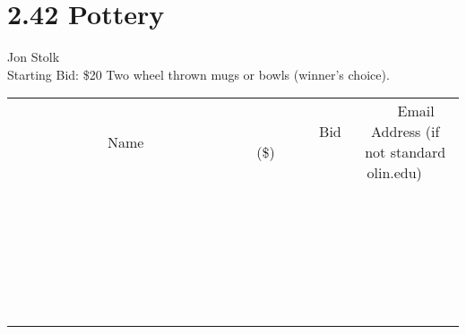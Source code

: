 \documentclass[11pt]{article}
\begin{document}
\section*{2.42 Pottery}
Jon Stolk
\\
Starting Bid: \$20
\newline
Two wheel thrown mugs or bowls (winner's choice).
\\[6ex]
\begin{tabular}{c c c}
~~~~~~~~~~~~~Name~~~~~~~~~~~~~ & ~~~~~~~~~Bid (\$)~~~~~~~~~  & ~~~Email Address (if not standard olin.edu)~~~\\
 & & \\
\hline
 & & \\
\hline
 & & \\
\hline
 & & \\
\hline
 & & \\
\hline
 & & \\
\hline
 & & \\
\hline
 & & \\
\hline
 & & \\
\hline
 & & \\
\hline
 & & \\
\hline
 & & \\
\hline
 & & \\
\hline
 & & \\
\hline
 & & \\
\hline
 & & \\
\hline
 & & \\
\hline
 & & \\
\hline
 & & \\
\hline
 & & \\
\hline
 & & \\
\hline
 & & \\
\hline
 & & \\
\hline
 & & \\
\hline
 & & \\
\hline
 & & \\
\hline
\end{tabular}
\newpage
\end{document}
